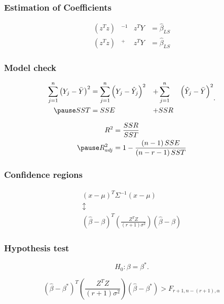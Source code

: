 \documentclass[aspectratio=169,10pt,t]{beamer}
\begin{document}
\begin{frame}[t]
	\frametitle{Estimation of Coefficients}
	\[
		\begin{aligned}
			\left( z^{T} z  \right)& ^{-1} &z^{T} Y &= \hat{\beta}_{LS}\\
			\left( z^{T} z  \right)& ^{+} &z^{T} Y &= \hat{\beta}_{LS}
		\end{aligned}
	\] 
\end{frame}

\begin{frame}[t]
	\frametitle{Model check}
	
	\[
		\begin{aligned}
			\sum^{n}_{j=1} 
			\left( Y_j -\bar{Y}   \right)^{2}
			&=
			\sum^{n}_{j=1}  \left( Y_j -\hat{Y}_{j}  \right) ^{2}
			&+
			&\sum^{n}_{j=1}&  \left( \hat{Y}_{j} - \bar{Y}  \right) ^{2} \\
			\pause
			SST &= SSE &+ &SSR
		\end{aligned}
	.\] 

	\[
	 \begin{aligned}
		 R^{2} &= \frac{SSR}{SST} \\
		 \pause
		 R^{2}_{adj} & = 1 - \frac{ \left( n-1 \right) SSE}{ \left( n-r-1 \right) SST} 
	 \end{aligned}
	\] 
\end{frame}

\begin{frame}[t]
	\frametitle{Confidence regions}

	\[
	\begin{gathered}
		\left( x- \mu  \right) ^{T} \Sigma^{-1}  \left( x- \mu \right) \\
													 \updownarrow\\
													 \left( \hat{\beta} - \beta \right) ^{T}
													 \left( \frac{Z^{T}Z}{ \left( r+1 \right) \sigma^{2}}   \right) 
													 \left( \hat{\beta}  -\beta\right) 
	\end{gathered}
	\] 

\end{frame}


\begin{frame}[t]
	\frametitle{Hypothesis test}

	\[
	H_0 : \beta = \beta^{*}
	.\] 

	\[
		\left( \hat{\beta} - \beta^{*}\right) ^{T}
		\left( \frac{Z^{T}Z}{ \left( r+1 \right) \sigma^{2}}   \right) 
		\left( \hat{\beta}  -\beta^{*}\right) 
		>
		F_{r+1,n- \left( r+1 \right) , \alpha}
	\] 

	
\end{frame}
\end{document}
